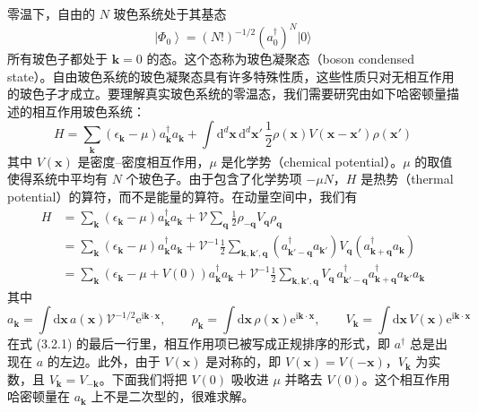 零温下，自由的 $N$ 玻色系统处于其基态
\begin{equation*}
\left|\Phi_0\right\rangle=(N!)^{-1/2}\left(a_0^{\dagger}\right)^N|0\rangle
\end{equation*}
所有玻色子都处于 $\pmb{k}=0$ 的态。这个态称为玻色凝聚态（boson condensed state）。自由玻色系统的玻色凝聚态具有许多特殊性质，这些性质只对无相互作用的玻色子才成立。要理解真实玻色系统的零温态，我们需要研究由如下哈密顿量描述的相互作用玻色系统：
\begin{equation*}
H=\sum_{\pmb{k}}(\epsilon_{\pmb{k}}-\mu)a_{\pmb{k}}^{\dagger}a_{\pmb{k}}+\int \mathrm{d}^d\pmb{x}\,\mathrm{d}^d\pmb{x}'\,\frac{1}{2}\rho(\pmb{x})V(\pmb{x}-\pmb{x}')\rho(\pmb{x}')
\end{equation*}
其中 $V(\pmb{x})$ 是密度--密度相互作用，$\mu$ 是化学势（chemical potential）。$\mu$ 的取值使得系统中平均有 $N$ 个玻色子。由于包含了化学势项 $-\mu N$，$H$ 是热势（thermal potential）的算符，而不是能量的算符。在动量空间中，我们有
\begin{align*}
H&=\sum_{\pmb{k}}(\epsilon_{\pmb{k}}-\mu)a_{\pmb{k}}^{\dagger}a_{\pmb{k}}+\mathcal{V}\sum_{\pmb{q}}\frac{1}{2}\rho_{-\pmb{q}}V_{\pmb{q}}\rho_{\pmb{q}}\\
&=\sum_{\pmb{k}}(\epsilon_{\pmb{k}}-\mu)a_{\pmb{k}}^{\dagger}a_{\pmb{k}}+\mathcal{V}^{-1}\frac{1}{2}\sum_{\pmb{k},\pmb{k}',\pmb{q}}\left(a_{\pmb{k}'-\pmb{q}}^{\dagger}a_{\pmb{k}'}\right)V_{\pmb{q}}\left(a_{\pmb{k}+\pmb{q}}^{\dagger}a_{\pmb{k}}\right)\\
&=\sum_{\pmb{k}}(\epsilon_{\pmb{k}}-\mu+V(0))a_{\pmb{k}}^{\dagger}a_{\pmb{k}}+\mathcal{V}^{-1}\frac{1}{2}\sum_{\pmb{k},\pmb{k}',\pmb{q}}V_{\pmb{q}}\,a_{\pmb{k}'-\pmb{q}}^{\dagger}a_{\pmb{k}+\pmb{q}}^{\dagger}a_{\pmb{k}'}a_{\pmb{k}}\tag{3.2.1}
\end{align*}
其中
\begin{equation*}
a_{\pmb{k}}=\int \mathrm{d}\pmb{x}\,a(\pmb{x})\mathcal{V}^{-1/2}\mathrm{e}^{\mathrm{i}\pmb{k}\cdot\pmb{x}},\qquad \rho_{\pmb{k}}=\int \mathrm{d}\pmb{x}\,\rho(\pmb{x})\mathrm{e}^{\mathrm{i}\pmb{k}\cdot\pmb{x}},\qquad V_{\pmb{k}}=\int \mathrm{d}\pmb{x}\,V(\pmb{x})\mathrm{e}^{\mathrm{i}\pmb{k}\cdot\pmb{x}}
\end{equation*}
在式 (3.2.1) 的最后一行里，相互作用项已被写成正规排序的形式，即 $a^{\dagger}$ 总是出现在 $a$ 的左边。此外，由于 $V(\pmb{x})$ 是对称的，即 $V(\pmb{x})=V(-\pmb{x})$，$V_{\pmb{k}}$ 为实数，且 $V_{\pmb{k}}=V_{-\pmb{k}}$。下面我们将把 $V(0)$ 吸收进 $\mu$ 并略去 $V(0)$。这个相互作用哈密顿量在 $a_{\pmb{k}}$ 上不是二次型的，很难求解。

